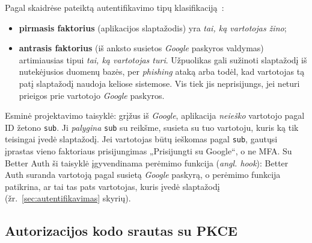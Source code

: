 Pagal skaidrėse pateiktą autentifikavimo tipų klasifikaciją~\cite{VMA}:
\begin{itemize}
    \item \textbf{pirmasis faktorius} (aplikacijos slaptažodis) yra \emph{tai, ką vartotojas žino};
    \item \textbf{antrasis faktorius} (iš anksto susietos \textit{Google} paskyros valdymas) artimiausias tipui \emph{tai, ką vartotojas turi}. Užpuolikas gali sužinoti slaptažodį iš nutekėjusios duomenų bazės, per \textit{phishing} ataką arba todėl, kad vartotojas tą patį slaptažodį naudoja keliose sistemose. Vis tiek jis neprisijungs, jei neturi prieigos prie vartotojo \textit{Google} paskyros.
\end{itemize}

Esminė projektavimo taisyklė: grįžus iš \textit{Google}, aplikacija \emph{neieško} vartotojo pagal ID žetono \texttt{sub}. Ji \emph{palygina} \texttt{sub} su reikšme, susieta su tuo vartotoju, kuris ką tik teisingai įvedė slaptažodį. Jei vartotojas būtų ieškomas pagal \texttt{sub}, gautųsi įprastas vieno faktoriaus prisijungimas „Prisijungti su Google“, o ne MFA. Su Better Auth ši taisyklė įgyvendinama perėmimo funkcija (\textit{angl. hook}): Better Auth suranda vartotoją pagal susietą \textit{Google} paskyrą, o perėmimo funkcija patikrina, ar tai tas pats vartotojas, kuris įvedė slaptažodį (žr.~\ref{sec:autentifikavimas} skyrių).

\subsection{Autorizacijos kodo srautas su PKCE}
\label{subsec:srautas}

